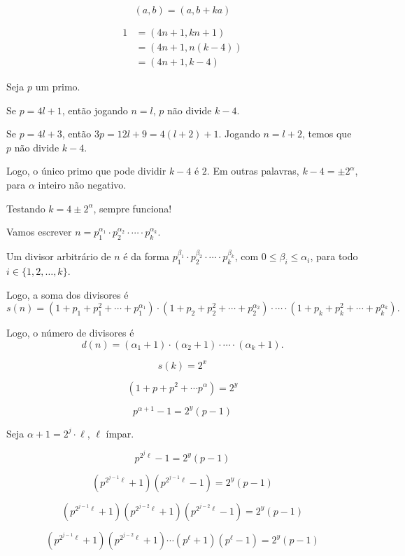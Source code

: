 \documentclass[10pt, a4paper]{article}
\begin{document}
	\begin{thm} 
		\[(a, b) = (a, b + ka)\]
	\end{thm}

	\begin{align*}
		1	&= (4n+1, kn+1)\\
			&= (4n + 1, n(k-4))\\
			&= (4n + 1, k-4)
	\end{align*}

	Seja $p$ um primo.
	
	Se $p = 4l + 1$, então jogando $n = l$, $p$ não divide $k-4$.

	Se $p = 4l + 3$, então $3p = 12l + 9 = 4(l + 2) + 1$. Jogando $n = l+2$, temos que $p$ não divide $k-4$.

	Logo, o único primo que pode dividir $k-4$ é $2$. Em outras palavras, $k - 4 = \pm 2^\alpha$, para $\alpha$ inteiro não negativo.

	Testando $k = 4 \pm 2^\alpha$, sempre funciona! 

	\newpage

	Vamos escrever $n = p_1^{\alpha_1} \cdot p_2^{\alpha_2} \cdot \cdots \cdot p_k^{\alpha_k}$.

	Um divisor arbitrário de $n$ é da forma $p_1^{\beta_1} \cdot p_2^{\beta_2} \cdot \cdots \cdot p_k^{\beta_k}$, com $0 \le \beta_i \le \alpha_i$, para todo $i \in \{1, 2, \dots, k\}$.
	
	Logo, a soma dos divisores é \[s(n) = (1 + p_1 + p_1^2 + \cdots + p_1^{\alpha_1})\cdot(1 + p_2 + p_2^2 + \cdots + p_2^{\alpha_2})\cdot\cdots\cdot(1 + p_k + p_k^2 + \cdots + p_k^{\alpha_k}).\]

	Logo, o número de divisores é \[d(n) = (\alpha_1 + 1) \cdot (\alpha_2 + 1)\cdot\cdots\cdot(\alpha_k + 1).\]
	
	\[s(k) = 2^x\]

	\[(1 + p + p^2 + \cdots p^\alpha) = 2^y\]

	\[p^{\alpha + 1} - 1 = 2^y (p - 1)\]

Seja $\alpha + 1 = 2^j \cdot \ell$, $\ell$ ímpar.

	\[p^{2^j \ell} - 1 = 2^y (p - 1)\]

	\[(p^{2^{j-1}\ell} + 1) (p^{2^{j-1}\ell} - 1) = 2^y (p-1)\]

	\[(p^{2^{j-1}\ell} + 1) (p^{2^{j-2}\ell} + 1) (p^{2^{j-2}\ell} - 1) = 2^y (p-1)\]

	\[(p^{2^{j-1}\ell} + 1) (p^{2^{j-2}\ell} + 1) \cdots (p^{\ell} + 1) (p^{\ell} - 1) = 2^y (p-1)\]
\end{document}
